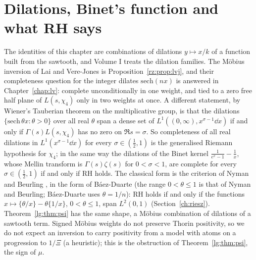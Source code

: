 \section{Dilations, Binet's function and what RH says}\label{lg:sec:rh}
The identities of this chapter are combinations of dilations $y\mapsto x/k$ of a function built from the sawtooth, and Volume I treats the dilation families. The Möbius inversion of Lai and Vere-Jones is Proposition~\ref{rz:prop:lvj}, and their completeness question for the integer dilates $\mathrm{sech}(nx)$ is answered in Chapter~\ref{chap:lv}: complete unconditionally in one weight, and tied to a zero free half plane of $L(s,\chi_4)$ only in two weights at once. A different statement, by Wiener's Tauberian theorem on the multiplicative group, is that the dilations $\{\mathrm{sech}\,\theta x:\theta>0\}$ over all real $\theta$ span a dense set of $L^1((0,\infty),x^{\sigma-1}\dd x)$ if and only if $\Gamma(s)L(s,\chi_4)$ has no zero on $\Re s=\sigma$. So completeness of all real dilations in $L^1(x^{\sigma-1}\dd x)$ for every $\sigma\in(\frac12,1)$ is the generalised Riemann hypothesis for $\chi_4$; in the same way the dilations of the Binet kernel $\frac1{e^x-1}-\frac1x$, whose Mellin transform is $\Gamma(s)\zeta(s)$ for $0<\sigma<1$, are complete for every $\sigma\in(\frac12,1)$ if and only if RH holds. The classical form is the criterion of Nyman \cite{Nyman50} and Beurling \cite{Beurling55}, in the form of Báez-Duarte \cite{BaezDuarte03} (the range $0<\theta\le1$ is that of Nyman and Beurling; Báez-Duarte uses $\theta=1/n$): RH holds if and only if the functions $x\mapsto\{\theta/x\}-\theta\{1/x\}$, $0<\theta\le1$, span $L^2(0,1)$ (Section~\ref{ch:riesz}). Theorem~\ref{lg:thm:psi} has the same shape, a Möbius combination of dilations of a sawtooth term. Signed Möbius weights do not preserve Thorin positivity, so we do not expect an inversion to carry positivity from a model with atoms on a progression to $1/\Xi$ (a heuristic); this is the obstruction of Theorem~\ref{lg:thm:psi}, the sign of $\mu$.

